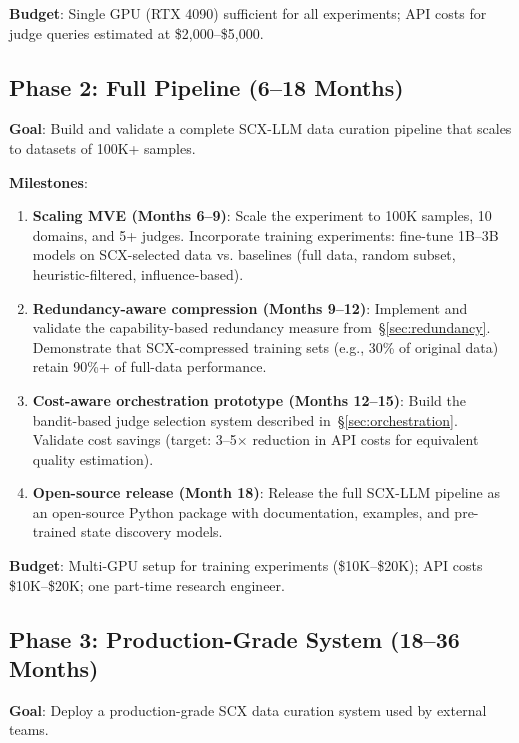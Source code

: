 \documentclass[11pt,twocolumn]{article}
\begin{document}
\textbf{Budget}: Single GPU (RTX 4090) sufficient for all experiments; API costs for judge queries estimated at \$2,000--\$5,000.

\subsection{Phase 2: Full Pipeline (6--18 Months)}

\textbf{Goal}: Build and validate a complete SCX-LLM data curation pipeline that scales to datasets of 100K+ samples.

\textbf{Milestones}:
\begin{enumerate}
    \item \textbf{Scaling MVE (Months 6--9)}: Scale the experiment to 100K samples, 10 domains, and 5+ judges. Incorporate training experiments: fine-tune 1B--3B models on SCX-selected data vs. baselines (full data, random subset, heuristic-filtered, influence-based).
    \item \textbf{Redundancy-aware compression (Months 9--12)}: Implement and validate the capability-based redundancy measure from~\S\ref{sec:redundancy}. Demonstrate that SCX-compressed training sets (e.g., 30\% of original data) retain 90\%+ of full-data performance.
    \item \textbf{Cost-aware orchestration prototype (Months 12--15)}: Build the bandit-based judge selection system described in~\S\ref{sec:orchestration}. Validate cost savings (target: 3--5$\times$ reduction in API costs for equivalent quality estimation).
    \item \textbf{Open-source release (Month 18)}: Release the full SCX-LLM pipeline as an open-source Python package with documentation, examples, and pre-trained state discovery models.
\end{enumerate}

\textbf{Budget}: Multi-GPU setup for training experiments (\$10K--\$20K); API costs \$10K--\$20K; one part-time research engineer.

\subsection{Phase 3: Production-Grade System (18--36 Months)}

\textbf{Goal}: Deploy a production-grade SCX data curation system used by external teams.
\end{document}
